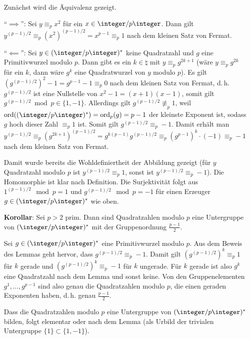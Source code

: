 \begin{Beweis}
    Zunächst wird die Äquivalenz gezeigt.
    
    "`$\implies$"':
    Sei $y \equiv_p x^2$ für ein $x \in \ZpZ$.
    Dann gilt $y^{(p-1)/2} \equiv_p (x^2)^{(p-1)/2} = x^{p-1} \equiv_p 1$
    nach dem kleinen Satz von Fermat.
    
    "`$\impliedby$"':
    Sei $y \in (\ZpZ)^\ast$ keine Quadratzahl und $g$ eine Primitivwurzel modulo $p$.
    Dann gibt es ein $k \in \natural$ mit $y \equiv_p g^{2k+1}$
    (wäre $y \equiv_p g^{2k}$ für ein $k$, dann wäre $g^k$ eine Quadratwurzel von $y$ modulo $p$).
    Es gilt $(g^{(p-1)/2})^2 - 1 = g^{p-1} - 1 \equiv_p 0$ nach dem kleinen Satz von Fermat,
    d.\,h. $g^{(p-1)/2}$ ist eine Nullstelle von $x^2 - 1 = (x+1)(x-1)$,
    somit gilt $g^{(p-1)/2} \bmod p \in \{1, -1\}$.
    Allerdings gilt $g^{(p-1)/2} \not\equiv_p 1$, weil $\ord((\ZpZ)^\ast) = \ord_p(g) = p - 1$
    der kleinste Exponent ist, sodass $g$ hoch dieser Zahl $\equiv_p 1$ ist.
    Somit gilt $g^{(p-1)/2} \equiv_p -1$.
    Damit erhält man\\
    $y^{(p-1)/2} \equiv_p (g^{2k+1})^{(p-1)/2} = g^{k(p-1)} g^{(p-1)/2}
    \equiv_p (g^{p-1})^k \cdot (-1) \equiv_p -1$
    nach dem kleinen Satz von Fermat.
    
    Damit wurde bereits die Wohldefiniertheit der Abbildung gezeigt
    (für $y$ Quadratzahl modulo $p$ ist $y^{(p-1)/2} \equiv_p 1$,
    sonst ist $y^{(p-1)/2} \equiv_p -1$).
    Die Homomorphie ist klar nach Definition.
    Die Surjektivität folgt aus $1^{(p-1)/2} \mod p = 1$ und
    $g^{(p-1)/2} \mod p = -1$ für einen Erzeuger\\
    $g \in (\ZpZ)^\ast$ wie oben.
\end{Beweis}

\linie
\pagebreak

\textbf{Korollar}:
Sei $p > 2$ prim.
Dann sind Quadratzahlen modulo $p$ eine Untergruppe von $(\ZpZ)^\ast$ mit der
Gruppenordnung $\frac{p-1}{2}$.

\begin{Beweis}
    Sei $g \in (\ZpZ)^\ast$ eine Primitivwurzel modulo $p$.
    Aus dem Beweis des Lemmas geht hervor, dass $g^{(p-1)/2} \equiv_p -1$.
    Damit gilt $(g^{(p-1)/2})^k \equiv_p 1$ für $k$ gerade und
    $(g^{(p-1)/2})^k \equiv_p -1$ für $k$ ungerade.
    Für $k$ gerade ist also $g^k$ eine Quadratzahl nach dem Lemma und sonst keine.
    Von den Gruppenelementen $g^1, \dotsc, g^{p-1}$ sind also genau die Quadratzahlen
    modulo $p$, die einen geraden Exponenten haben, d.\,h. genau $\frac{p-1}{2}$.
    
    Dass die Quadratzahlen modulo $p$
    eine Untergruppe von $(\ZpZ)^\ast$ bilden, folgt elementar
    oder nach dem Lemma (als Urbild der trivialen Untergruppe $\{1\} \subset \{1, -1\}$).
\end{Beweis}

